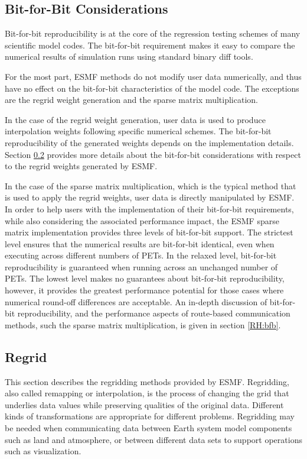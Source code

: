 \subsection{Bit-for-Bit Considerations}

Bit-for-bit reproducibility is at the core of the regression testing
schemes of many scientific model codes. The bit-for-bit requirement makes it
easy to compare the numerical results of simulation runs using standard
binary diff tools.

For the most part, ESMF methods do not modify user data numerically, and
thus have no effect on the bit-for-bit characteristics of the model code.
The exceptions are the regrid weight generation and the sparse matrix
multiplication.

In the case of the regrid weight generation, user data is used to produce
interpolation weights following specific numerical schemes. The bit-for-bit
reproducibility of the generated weights depends on the implementation
details. Section \ref{sec:regrid} provides more details about the bit-for-bit
considerations with respect to the regrid weights generated by ESMF.

In the case of the sparse matrix multiplication, which is the typical method
that is used to apply the regrid weights, user data is directly manipulated 
by ESMF. In order to help users with the implementation of their bit-for-bit
requirements, while also considering the associated performance impact,
the ESMF sparse matrix implementation provides three levels of bit-for-bit
support. The strictest level ensures that the numerical results are
bit-for-bit identical, even when executing across different numbers of
PETs. In the relaxed level, bit-for-bit reproducibility is guaranteed when
running across an unchanged number of PETs. The lowest level makes no
guarantees about bit-for-bit reproducibility, however, it provides the
greatest performance potential for those cases where numerical round-off
differences are acceptable. An in-depth discussion of bit-for-bit
reproducibility, and the performance aspects of route-based communication
methods, such the sparse matrix multiplication, is given in section
\ref{RH:bfb}.


\subsection{Regrid}\label{sec:regrid}

 This section describes the regridding methods provided by ESMF. Regridding, also called remapping or interpolation, is 
 the process of changing the grid that underlies data values while preserving qualities of the original data. Different 
 kinds of transformations are appropriate for different problems. Regridding may be needed when communicating data between
 Earth system model components such as land and atmosphere, or between different data sets to support operations such as visualization.

